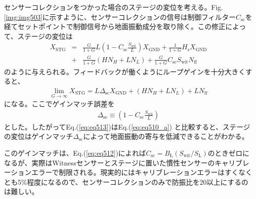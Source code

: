 センサーコレクションをつかった場合のステージの変位を考える。Fig.\ref{img:img503}に示すように、センサーコレクションの信号は制御フィルター$C_{\mathrm{sc}}$を経てセットポイントで制御信号から地面振動成分を取り除く。この修正によって、ステージの変位は
\begin{eqnarray}\nonumber
  X_{\mathrm{STG}} &=&\frac{G}{1+G}L\left(1-C_{\mathrm{sc}}\frac{S_{\mathrm{wit}}}{L}\right) X_{\mathrm{GND}} + \frac{1}{1+G}H_{\mathrm{s}}X_{\mathrm{GND}}\\ 
  &+& \frac{G}{1+G}\left(HN_{H}+LN_{L}\right) + \frac{G}{1+G}C_{\mathrm{sc}}S_{\mathrm{wit}}N_{\mathrm{ff}} \label{eq:eq511}
\end{eqnarray}
のように与えられる。フィードバックが働くようにループゲインを十分大きくすると、
\begin{eqnarray}
  \lim_{G\to\infty} X_{\mathrm{STG}} = L\Delta_{\mathrm{sc}} X_{\mathrm{GND}} + \left(HN_{H}+LN_{L}\right) + {L}N_{\mathrm{ff}} \label{eq:eq513}
\end{eqnarray}
になる。ここでゲインマッチ誤差を
\begin{eqnarray}
  \Delta_{\mathrm{sc}} \equiv \left(1-C_{\mathrm{sc}}\frac{S_{\mathrm{wit}}}{L}\right) \label{eq:eq512}
\end{eqnarray}
とした。したがってEq.(\ref{eq:eq513})はEq.(\ref{eq:eq510_a}) と比較すると、ステージの変位はゲインマッチ$\Delta_{\mathrm{sc}}$によって地面振動の寄与を低減できることがわかる。

このゲインマッチは、Eq.(\ref{eq:eq512})によれば$C_{\mathrm{sc}}=B_{\mathrm{L}}(S_{\mathrm{wit}}/S_{\mathrm{L}})$のときゼロになるが、実際はWitnessセンサーとステージに置いた慣性センサーのキャリブレーションエラーで制限される。現実的にはキャリブレーションエラーはすくなくとも5\%程度になるので、センサーコレクションのみで防振比を20以上にするのは難しい\cite{hua2005low}。


